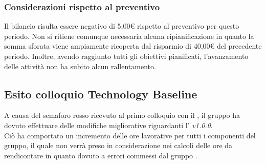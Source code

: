 \subsubsection{Considerazioni rispetto al preventivo} \label{subsubsection:considerazioni_finali_PoC}
Il bilancio risulta essere negativo di 5,00€ rispetto al preventivo per questo periodo.
Non si ritiene comunque necessaria alcuna ripianificazione in quanto la somma sforata viene ampiamente ricoperta dal risparmio di 40,00€ del precedente periodo.
Inoltre, avendo raggiunto tutti gli obiettivi pianificati, l'avanzamento delle attività non ha subito alcun rallentamento.

\vspace{1cm}

\subsection{Esito colloquio Technology Baseline} \label{subsubsection:esito_TB}
A causa del semaforo rosso ricevuto al primo colloquio con il \commitNameS{}, il gruppo ha dovuto effettuare delle modifiche migliorative riguardanti l'\docNameAdR{} \textit{v1.0.0}.\\
Ciò ha comportato un incremento delle ore lavorative per tutti i componenti del gruppo, il quale non verrà preso in considerazione nei calcoli delle ore da rendicontare in quanto dovuto a errori commessi dal gruppo \groupName{}.

\vspace{2cm}



